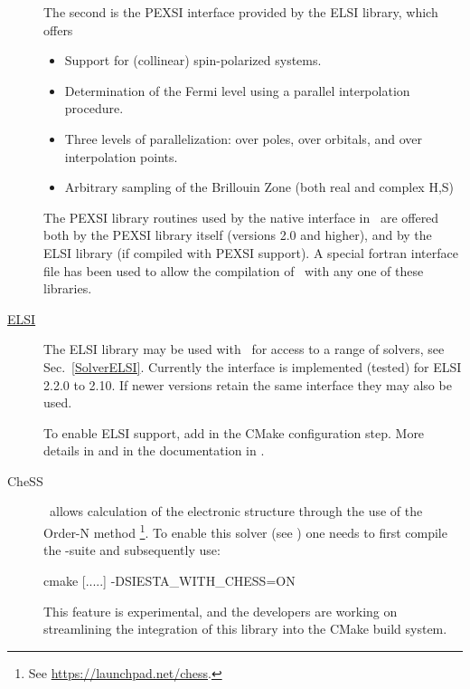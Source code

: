 \begin{description}
  The second is the PEXSI interface provided by the ELSI library, which offers
  \begin{itemize}
    \item Support for (collinear) spin-polarized systems.
    \item Determination of the Fermi level using a parallel interpolation procedure.
    \item Three levels of parallelization: over poles, over orbitals,
          and over interpolation points.
    \item Arbitrary sampling of the Brillouin Zone (both real and
      complex H,S)
  \end{itemize}

  The PEXSI library routines used by the native interface in \siesta\ are
  offered both by the PEXSI library itself (versions 2.0 and higher), and by the ELSI library
  (if compiled with PEXSI support). A special fortran interface file has been used to allow
  the compilation of \siesta\ with any one of these libraries.

  \item[\href{http://elsi-interchange.org}{ELSI}]%
  The ELSI library may be used with \siesta\ for access to a range of
  solvers, see Sec.~\ref{SolverELSI}. Currently the interface is
  implemented (tested) for ELSI 2.2.0 to 2.10. If
  newer versions retain the same interface they may also be used.

  To enable ELSI support, add  in the CMake
  configuration step. More details in  and in
  the documentation in .

  \item[CheSS]%

  \siesta\ allows calculation of the electronic structure through the
  use of the Order-N method \footnote{See
      \url{https://launchpad.net/chess}.}. To enable this solver (see
  ) one needs to first compile the
  -suite and subsequently use:

\begin{shellexample}
  cmake [.....] -DSIESTA_WITH_CHESS=ON
\end{shellexample}

  \note This feature is experimental, and the developers are working
  on streamlining the integration of this library into the CMake build
  system.


\end{description}
